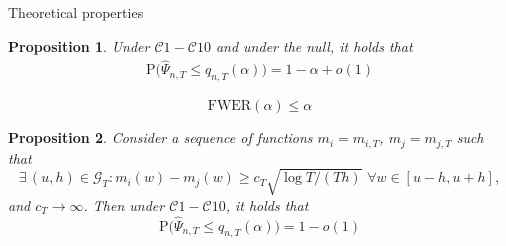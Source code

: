 \documentclass[10pt]{beamer}
\newcommand{\Prob}{\mathrm{P}}
\newtheorem{prop}{Proposition}
\begin{document}
\begin{frame}{Theoretical properties}
\begin{prop} Under $\mathcal{C}1 - \mathcal{C}10$ and under the null, it holds that 
\vspace{-2mm}
\begin{align*}
\Prob\Big(\widehat{\Psi}_{n, T} \leq q_{n, T}(\alpha)\Big) = 1 - \alpha + o(1)
\end{align*}
\vspace{-5mm}
\end{prop} \pause
\begin{corollary} $$\text{FWER}(\alpha)\leq \alpha$$
\end{corollary} \pause
\begin{prop}\label{prop2}
Consider a sequence of functions $m_{i} = m_{i,T}$, $m_{j} = m_{j, T}$ such that 
\begin{equation*}
\exists \, (u, h)\in \mathcal{G}_{T}:  m_{i}(w) - m_{j}(w) \ge c_T \sqrt{\log T / (T h)} \,\, \forall w \in [u-h, u+h],
\end{equation*} and $c_T \rightarrow \infty$. Then under $\mathcal{C}1 - \mathcal{C}10$, it holds that
\vspace{-2mm}
\begin{equation*}
\Prob\Big( \widehat{\Psi}_{n, T} \leq q_{n, T}(\alpha)\Big) = 1 - o(1)
\end{equation*}
\vspace{-5mm}
\end{prop}
\end{frame}
\end{document}
